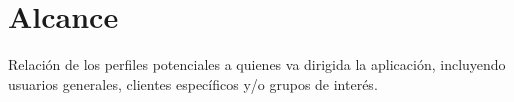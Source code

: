 \section{Alcance}
\label{sec:scope}

\begin{shaded}
Relación de los perfiles potenciales a quienes va dirigida la aplicación, incluyendo usuarios generales, clientes específicos y/o grupos de interés.
\end{shaded}